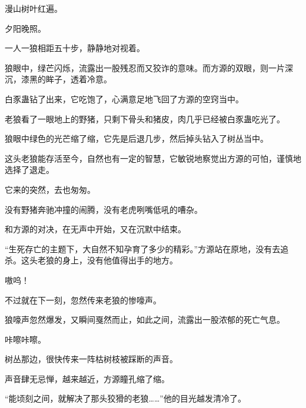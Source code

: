 \begin{this_body}
漫山树叶红遍。

夕阳晚照。

一人一狼相距五十步，静静地对视着。

狼眼中，绿芒闪烁，流露出一股残忍而又狡诈的意味。而方源的双眼，则一片深沉，漆黑的眸子，透着冷意。

白豕蛊钻了出来，它吃饱了，心满意足地飞回了方源的空窍当中。

老狼看了一眼地上的野猪，只剩下骨头和猪皮，肉几乎已经被白豕蛊吃光了。

狼眼中绿色的光芒缩了缩，它先是后退几步，然后掉头钻入了树丛当中。

这头老狼能存活至今，自然也有一定的智慧，它敏锐地察觉出方源的可怕，谨慎地选择了退走。

它来的突然，去也匆匆。

没有野猪奔驰冲撞的闹腾，没有老虎咧嘴低吼的嘈杂。

和方源的对决，在无声中开始，又在沉默中结束。

“生死存亡的主题下，大自然不知孕育了多少的精彩。”方源站在原地，没有去追杀。这头老狼的身上，没有他值得出手的地方。

嗷呜！

不过就在下一刻，忽然传来老狼的惨嚎声。

狼嚎声忽然爆发，又瞬间戛然而止，如此之间，流露出一股浓郁的死亡气息。

咔嚓咔嚓。

树丛那边，很快传来一阵枯树枝被踩断的声音。

声音肆无忌惮，越来越近，方源瞳孔缩了缩。

“能顷刻之间，就解决了那头狡猾的老狼……”他的目光越发清冷了。

\end{this_body}

